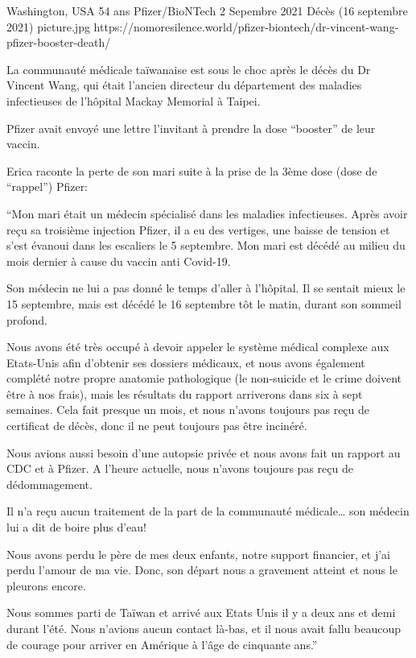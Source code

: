 {Washington, USA}
{54 ans}
{Pfizer/BioNTech}
{2 Sepembre 2021}
{Décès (16 septembre 2021)}
{picture.jpg}
{https://nomoresilence.world/pfizer-biontech/dr-vincent-wang-pfizer-booster-death/}
{

La communauté médicale taïwanaise est sous le choc après le décès du Dr Vincent
Wang, qui était l'ancien directeur du département des maladies infectieuses de
l'hôpital Mackay Memorial à Taipei.

Pfizer avait envoyé une lettre l'invitant à prendre la dose “booster” de leur
vaccin.

Erica raconte la perte de son mari suite à la prise de la 3ème dose (dose de
“rappel”) Pfizer:

“Mon mari était un médecin spécialisé dans les maladies infectieuses. Après
avoir reçu sa troisième injection Pfizer, il a eu des vertiges, une baisse de
tension et s'est évanoui dans les escaliers le 5 septembre. Mon mari est décédé
au milieu du mois dernier à cause du vaccin anti Covid-19.

Son médecin ne lui a pas donné le temps d'aller à l'hôpital. Il se sentait mieux
le 15 septembre, mais est décédé le 16 septembre tôt le matin, durant son
sommeil profond.

Nous avons été très occupé à devoir appeler le système médical complexe aux
Etats-Unis afin d'obtenir ses dossiers médicaux, et nous avons également
complété notre propre anatomie pathologique (le non-suicide et le crime doivent
être à nos frais), mais les résultats du rapport arriverons dans six à sept
semaines. Cela fait presque un mois, et nous n'avons toujours pas reçu de
certificat de décès, donc il ne peut toujours pas être incinéré.

Nous avions aussi besoin d'une autopsie privée et nous avons fait un rapport au
CDC et à Pfizer. A l'heure actuelle, nous n'avons toujours pas reçu de
dédommagement.

Il n'a reçu aucun traitement de la part de la communauté médicale… son médecin
lui a dit de boire plus d'eau!

Nous avons perdu le père de mes deux enfants, notre support financier, et j'ai
perdu l'amour de ma vie. Donc, son départ nous a gravement atteint et nous le
pleurons encore.

Nous sommes parti de Taïwan et arrivé aux Etats Unis il y a deux ans et demi
durant l'été. Nous n'avions aucun contact là-bas, et il nous avait fallu
beaucoup de courage pour arriver en Amérique à l'âge de cinquante ans.”

}
